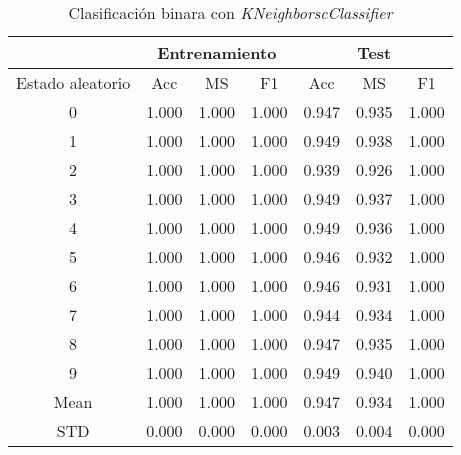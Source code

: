 \begin{table}[th]
	\centering
	\begin{tabular}{ |c|c|c|c|c|c|c| }
		\hline
		\rowcolor{LightCyan}
		 & \multicolumn{3}{c|}{Entrenamiento} & \multicolumn{3}{c|}{Test} \\
		\hline
		\rowcolor{LightCyan}
		 Estado aleatorio & Acc & MS & F1 & Acc & MS & F1 \\
		\hline
		0 & 1.000 & 1.000 & 1.000 & 0.947 & 0.935 & 1.000 \\
		1 & 1.000 & 1.000 & 1.000 & 0.949 & 0.938 & 1.000 \\
		2 & 1.000 & 1.000 & 1.000 & 0.939 & 0.926 & 1.000 \\
		3 & 1.000 & 1.000 & 1.000 & 0.949 & 0.937 & 1.000 \\
		4 & 1.000 & 1.000 & 1.000 & 0.949 & 0.936 & 1.000 \\
		5 & 1.000 & 1.000 & 1.000 & 0.946 & 0.932 & 1.000 \\
		6 & 1.000 & 1.000 & 1.000 & 0.946 & 0.931 & 1.000 \\
		7 & 1.000 & 1.000 & 1.000 & 0.944 & 0.934 & 1.000 \\
		8 & 1.000 & 1.000 & 1.000 & 0.947 & 0.935 & 1.000 \\
		9 & 1.000 & 1.000 & 1.000 & 0.949 & 0.940 & 1.000 \\
		Mean & 1.000 & 1.000 & 1.000 & 0.947 & 0.934 & 1.000 \\
		STD & 0.000 & 0.000 & 0.000 & 0.003 & 0.004 & 0.000 \\
		\hline
	\end{tabular}
	\caption{Clasificación binara con \textit{KNeighborscClassifier}}
	\label{tabla:knn_bin}
\end{table}
